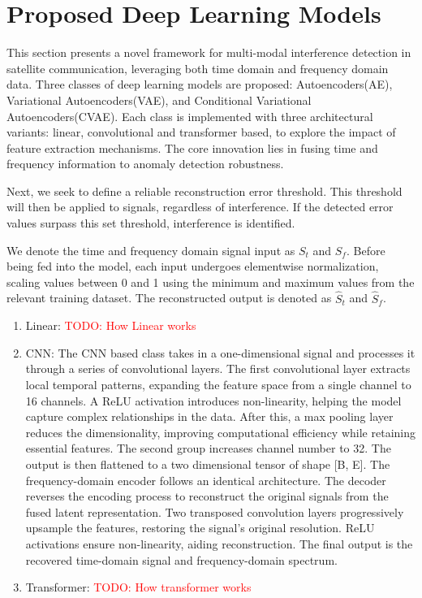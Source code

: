 \documentclass[12pt]{article}
\newcommand{\todo}[1]{\textcolor{red}{TODO: #1}}
\begin{document}
\section{Proposed Deep Learning Models}

This section presents a novel framework for multi-modal interference detection in satellite communication, leveraging both time domain and frequency domain data. Three classes of deep learning models are proposed: Autoencoders(AE), Variational Autoencoders(VAE), and Conditional Variational Autoencoders(CVAE). Each class is implemented with three architectural variants: linear, convolutional and transformer based, to explore the impact of feature extraction mechanisms. The core innovation lies in fusing time and frequency information to anomaly detection robustness.

Next, we seek to define a reliable reconstruction error threshold. This threshold will then be applied to signals, regardless of interference. If the detected error values surpass this set threshold, interference is identified.

We denote the time and frequency domain signal input as $S_{t}$ and $S_f$. Before being fed into the model, each input undergoes elementwise normalization, scaling values between 0 and 1 using the minimum and maximum values from the relevant training dataset. The reconstructed output is denoted as $\hat{S}_{t}$ and $\hat{S}_{f}$.

\begin{enumerate}
    \item Linear: \todo{How Linear works}
    \item CNN: The CNN based class takes in a one-dimensional signal and processes it through a series of convolutional layers. The first convolutional layer extracts local temporal patterns, expanding the feature space from a single channel to 16 channels. A ReLU activation introduces non-linearity, helping the model capture complex relationships in the data. After this, a max pooling layer reduces the dimensionality, improving computational efficiency while retaining essential features. The second group increases channel number to 32. The output is then flattened to a two dimensional tensor of shape [B, E]. The frequency-domain encoder follows an identical architecture. The decoder reverses the encoding process to reconstruct the original signals from the fused latent representation. Two transposed convolution layers progressively upsample the features, restoring the signal's original resolution. ReLU activations ensure non-linearity, aiding reconstruction. The final output is the recovered time-domain signal and frequency-domain spectrum.
    \item Transformer: \todo{How transformer works}
\end{enumerate}
\end{document}
